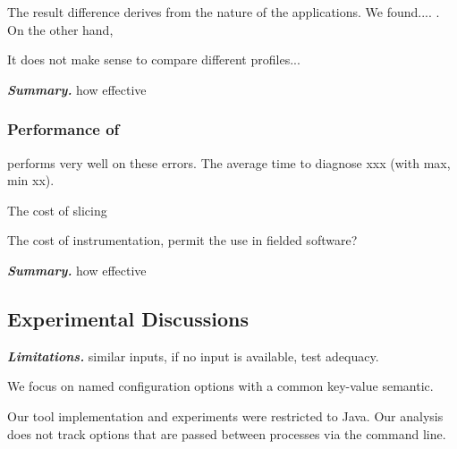 The result difference derives from the nature of the applications.
We found....  . On the other hand,

It does not make sense to compare different profiles...




\vspace{1mm}
\noindent \textbf{\textit{Summary.}} how effective

\subsubsection{Performance of \ourtool}

\ourtool performs very well on these errors. The average time
to diagnose xxx (with max, min xx).

The cost of slicing

The cost of instrumentation, permit the use in fielded software?




\vspace{1mm}
\noindent \textbf{\textit{Summary.}} how effective

\vspace{1mm}

\subsection{Experimental Discussions}


\noindent \textbf{\textit{Limitations.}} similar inputs, if no input is available, test adequacy.

We focus on named configuration options with a common key-value semantic.

Our tool implementation and experiments were restricted to Java. Our analysis
does not track options that are passed between processes via the command line.

